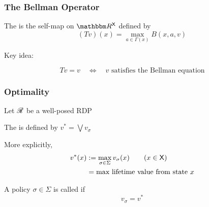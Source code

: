 \documentclass[dvipsnames]{beamer}
\begin{document}
\begin{frame}
    \frametitle{The Bellman Operator}
    

    \vspace{0.5em}
    The  is the self-map on $\RR^\Xsf$ defined by
    \begin{equation*}
        (Tv)(x)
            = \max_{a \in \Gamma(x)}
            B(x, a, v)
    \end{equation*}


    \vspace{0.5em}
    \vspace{0.5em}
    \vspace{0.5em}
    Key idea:

    \begin{equation*}
        Tv=v
        \quad \iff \quad
        v \text{ satisfies the Bellman equation}
    \end{equation*}

\end{frame}




\begin{frame}
    \frametitle{Optimality}

    Let $\mathscr R$ be a well-posed RDP

    \vspace{0.5em}
    \vspace{0.5em}
    The  is defined by $v^* = \bigvee v_\sigma$


    \vspace{0.5em}
    \vspace{0.5em}
    More explicitly,
    \begin{align*}
        v^*(x) 
        & := \max_{\sigma \in \Sigma} v_\sigma(x)
        \qquad (x \in \mathsf X)
        \\
        & =  \text{max lifetime value from state $x$}
    \end{align*}

    \vspace{0.5em}
    \vspace{0.5em}
    \vspace{0.5em}
    A policy $\sigma \in \Sigma$ is called  if
    \begin{equation*}
        v_\sigma = v^*
    \end{equation*}

\end{frame}
\end{document}
